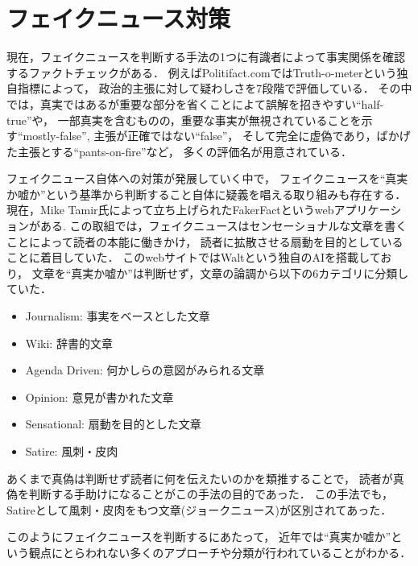 \section{フェイクニュース対策}
現在，フェイクニュースを判断する手法の1つに有識者によって事実関係を確認するファクトチェックがある．
例えばPolitifact.comではTruth-o-meterという独自指標によって，
政治的主張に対して疑わしさを7段階で評価\cite{holan_2018}している．
その中では，真実ではあるが重要な部分を省くことによて誤解を招きやすい``half-true''や，
一部真実を含むものの，重要な事実が無視されていることを示す``mostly-false'',
主張が正確ではない``false''，
そして完全に虚偽であり，ばかげた主張とする``pants-on-fire''など，
多くの評価名が用意されている．

フェイクニュース自体への対策が発展していく中で，
フェイクニュースを``真実か嘘か''という基準から判断すること自体に疑義を唱える取り組みも存在する．
現在，Mike Tamir氏によって立ち上げられたFakerFactというwebアプリケーションがある\cite{tamir}.
この取組では，フェイクニュースはセンセーショナルな文章を書くことによって読者の本能に働きかけ，
読者に拡散させる扇動を目的としていることに着目していた．
このwebサイトではWaltという独自のAIを搭載しており，
文章を``真実か嘘か''は判断せず，文章の論調から以下の6カテゴリに分類していた．

\begin{itemize}
    \item Journalism: 事実をベースとした文章
    \item Wiki: 辞書的文章
    \item Agenda Driven: 何かしらの意図がみられる文章
    \item Opinion: 意見が書かれた文章
    \item Sensational: 扇動を目的とした文章
    \item Satire: 風刺・皮肉
\end{itemize}

あくまで真偽は判断せず読者に何を伝えたいのかを類推することで，
読者が真偽を判断する手助けになることがこの手法の目的であった．
この手法でも，Satireとして風刺・皮肉をもつ文章(ジョークニュース)が区別されてあった．

このようにフェイクニュースを判断するにあたって，
近年では``真実か嘘か''という観点にとらわれない多くのアプローチや分類が行われていることがわかる．
